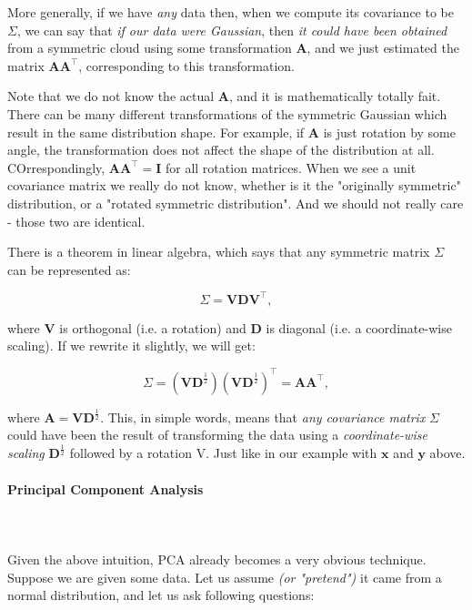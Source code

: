 \documentclass{article}
\begin{document}
More generally, if we have \textit{any} data then, when we compute its covariance to be $\Sigma$, we can say that \textit{if our data were Gaussian}, then \textit{it could have been obtained} from a symmetric cloud using some transformation $\bm{A}$, and we just estimated the matrix $\bm{A}\bm{A}^{\intercal}$, corresponding to this transformation.\medskip

Note that we do not know the actual $\bm{A}$, and it is mathematically totally fait. There can be many different transformations of the symmetric Gaussian which result in the same distribution shape. For example, if $\bm{A}$ is just rotation by some angle, the transformation does not affect the shape of the distribution at all. COrrespondingly, $\bm{A}\bm{A}^{\intercal} = \bm{I}$ for all rotation matrices. When we see a unit covariance matrix we really do not know, whether is it the "originally symmetric" distribution, or a "rotated symmetric distribution". And we should not really care - those two are identical.\medskip

There is a theorem in linear algebra, which says that any symmetric matrix $\Sigma$ can be represented as:

\begin{equation}
  \label{eqn_sigma_decomposition}
  \Sigma = \bm{V}\bm{D}\bm{V}^{\intercal},
\end{equation}

where $\bm{V}$ is orthogonal (i.e. a rotation) and $\bm{D}$ is diagonal (i.e. a coordinate-wise scaling). If we rewrite it slightly, we will get:

\begin{equation}
  \Sigma = \left(\bm{V}\bm{D}^{\frac{1}{2}}\right)\left(\bm{V}\bm{D}^\frac{1}{2}\right)^{\intercal} = \bm{A}\bm{A}^{\intercal},
\end{equation}

where $\bm{A} = \bm{V}\bm{D}^{\frac{1}{2}}$. This, in simple words, means that \textit{any covariance matrix} $\Sigma$ could have been the result of transforming the data using a \textit{coordinate-wise scaling} $\bm{D}^{\frac{1}{2}}$ followed by a rotation V. Just like in our example with $\bm{x}$ and $\bm{y}$ above.

\paragraph{Principal Component Analysis}\mbox{}\\\\
Given the above intuition, PCA already becomes a very obvious technique. Suppose we are given some data. Let us assume \textit{(or "pretend")} it came from a normal distribution, and let us ask following questions:
\end{document}
